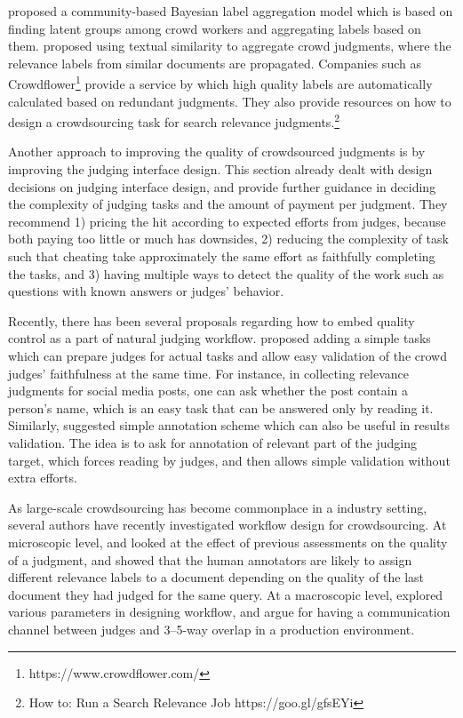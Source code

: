 \cite{Venanzi:2014} proposed a community-based Bayesian label aggregation model which is based on finding latent groups among crowd workers and aggregating labels based on them. \cite{Davtyan2015} proposed using textual similarity to aggregate crowd judgments, where the relevance labels from similar documents are propagated. Companies such as Crowdflower\footnote{https://www.crowdflower.com/} provide a service by which high quality labels are automatically calculated based on redundant judgments. They also provide resources on how to design a crowdsourcing task for search relevance judgments.\footnote{How to: Run a Search Relevance Job https://goo.gl/gfsEYi}  

Another approach to improving the quality of crowdsourced judgments is by improving the judging interface design. This section already dealt with design decisions on judging interface design, and \cite{Kazai2012} provide further guidance in deciding the complexity of judging tasks and the amount of payment per judgment. They recommend 1) pricing the hit according to expected efforts from judges, because both paying too little or much has downsides, 2) reducing the complexity of task such that cheating take approximately the same effort as faithfully completing the tasks, and 3) having multiple ways to detect the quality of the work such as questions with known answers or judges' behavior.

Recently, there has been several proposals regarding how to embed quality control as a part of natural judging workflow. \cite{Alonso:2015} proposed adding a simple tasks which can prepare judges for actual tasks and allow easy validation of the crowd judges' faithfulness at the same time. For instance, in collecting relevance judgments for social media posts, one can ask whether the post contain a person's name, which is an easy task that can be answered only by reading it. Similarly, \cite{mcdonnell2016relevant} suggested simple annotation scheme which can also be useful in results validation. The idea is to ask for annotation of relevant part of the judging target, which forces reading by judges, and then allows simple validation without extra efforts.

As large-scale crowdsourcing has become commonplace in a industry setting, several authors have recently investigated workflow design for crowdsourcing. At microscopic level, \cite{Scholer:2013} and \cite{Shokouhi:2015} looked at the effect of previous assessments on the quality of a judgment, and showed that the human annotators are likely to assign different relevance labels to a document depending on the quality of the last document they had judged for the same query. At a macroscopic level, \cite{Megorskaya2015} explored various parameters in designing workflow, and argue for having a communication channel between judges and 3--5-way overlap in a production environment.



